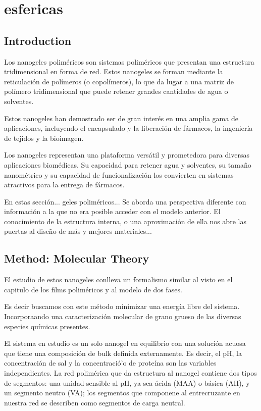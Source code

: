 \chapter{esfericas}

\section{Introduction}

Los nanogeles polim\'ericos son sistemas polim\'ericos que presentan una estructura tridimensional en forma de red. Estos nanogeles se forman mediante la reticulaci\'on de pol\'imeros (o copol\'imeros), lo que da lugar a una matriz de pol\'imero tridimensional que puede retener grandes cantidades de agua o solventes.

Estos nanogeles han demostrado ser de gran inter\'es en una amplia gama de aplicaciones, incluyendo el encapsulado y la liberaci\'on  de fármacos, la ingenier\'ia de tejidos y la bioimagen.



Los nanogeles representan una plataforma vers\'atil y prometedora para diversas aplicaciones biom\'edicas. Su capacidad para retener agua y solventes, su tama\~no nanom\'etrico y su capacidad de funcionalizaci\'on los convierten en sistemas atractivos para la entrega de f\'armacos.


En estas secci\'on... geles polim\'ericos... 
Se aborda una perspectiva diferente con informaci\'on a la que no era posible acceder con el modelo anterior.
El conocimiento  de la estructura interna, o una aproximaci\'on de ella nos abre las puertas al dise\~no de m\'as y mejores materiales...

\section{Method: Molecular Theory}

El estudio de estos nanogeles conlleva un formalismo similar al visto en el capitulo de los films polim\'ericos y al modelo de dos fases.


Es decir buscamos con este m\'etodo  minimizar una energ\'ia libre del sistema.
Incorporaando una caracterizaci\'on molecular de grano grueso de las diversas especies qu\'imicas presentes.

El sistema en estudio es un solo nanogel en equilibrio con una solución acuosa que tiene una composici\'on de bulk definida externamente.
Es decir, el pH, la concentraci\'on de sal y la concentració'o de prote\'ina son las variables independientes.
La red polim\'erica que da estructura al nanogel contiene dos tipos de segmentos: una unidad sensible al pH, ya sea \'acida (MAA) o b\'asica (AH), y un segmento neutro (VA);
los segmentos que componene al entrecruzante en nuestra red se describen como segmentos de carga neutral.

